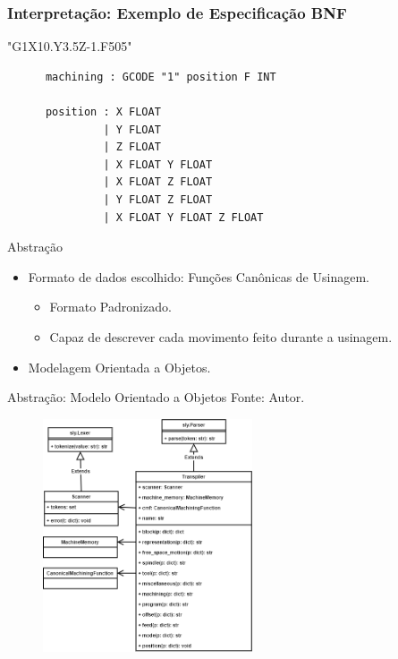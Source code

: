 \documentclass[aspectratio=169]{beamer}
\begin{document}
{\begin{frame}[fragile]
  \frametitle{Interpretação: Exemplo de Especificação BNF}
  \begin{example}
   "G1X10.Y3.5Z-1.F505"
    \begin{lstlisting}
      machining : GCODE "1" position F INT

      position : X FLOAT
               | Y FLOAT
               | Z FLOAT
               | X FLOAT Y FLOAT
               | X FLOAT Z FLOAT
               | Y FLOAT Z FLOAT
               | X FLOAT Y FLOAT Z FLOAT
    \end{lstlisting}
  \end{example}  
\end{frame}


\begin{frame}{Abstração}
  \begin{itemize}
    \item Formato de dados escolhido: Funções Canônicas de Usinagem.
    \begin{itemize}
      \item Formato Padronizado.
      \item Capaz de descrever cada movimento feito durante a usinagem.
    \end{itemize}
    \item Modelagem Orientada a Objetos.
  \end{itemize}
\end{frame}


\begin{frame}{Abstração: Modelo Orientado a Objetos}
  Fonte: Autor.
  \begin{figure}[H]
    \centering
    \includegraphics[width=6.2cm]{ncparser-class-transpiler.png}
  \end{figure}
\end{frame}


}
\end{document}
